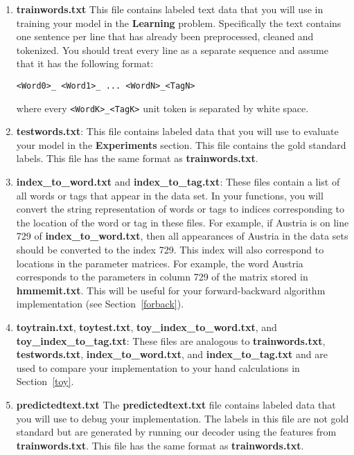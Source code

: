 \documentclass{article}
\begin{document}
\begin{enumerate}

\item \textbf{trainwords.txt} This file contains labeled text data that you will use in training your model in the \textbf{Learning} problem. Specifically the text contains one sentence per line that has already been preprocessed, cleaned and tokenized. You should treat every line as a separate sequence and assume that it has the following format:

    \texttt{<Word0>\_<Tag0> <Word1>\_<Tag1> ... <WordN>\_<TagN>}

where every \texttt{<WordK>\_<TagK>} unit token is separated by white space.

\item \textbf{testwords.txt}: This file contains labeled data that you will use to evaluate your model in the \textbf{Experiments} section. This file contains the gold standard labels.  This file has the same format as \textbf{trainwords.txt}.
    
\item \textbf{index\_to\_word.txt} and \textbf{index\_to\_tag.txt}: These files contain a list of all words or tags that appear in the data set. In your functions, you will convert the string representation of words or tags to indices corresponding to the location of the word or tag in these files. For example, if Austria is on line 729 of \textbf{index\_to\_word.txt}, then all appearances of Austria in the data sets should be converted to the index 729. This index will also correspond to locations in the parameter matrices. For example, the word Austria corresponds to the parameters in column 729 of the matrix stored in \textbf{hmmemit.txt}. This will be useful for your forward-backward algorithm implementation (see Section~\ref{forback}).
    
\item \textbf{toytrain.txt}, \textbf{toytest.txt}, \textbf{toy\_index\_to\_word.txt}, and \textbf{toy\_index\_to\_tag.txt}: These files are analogous to \textbf{trainwords.txt}, \textbf{testwords.txt}, \textbf{index\_to\_word.txt}, and \textbf{index\_to\_tag.txt} and are used to compare your implementation to your hand calculations in Section~\ref{toy}.

\item \textbf{predictedtext.txt} The \textbf{predictedtext.txt} file contains labeled data that you will use to debug your implementation. The labels in this file are not gold standard but are generated by running our decoder using the features from \textbf{trainwords.txt}. This file has the same format as \textbf{trainwords.txt}.


\end{enumerate}
\end{document}
